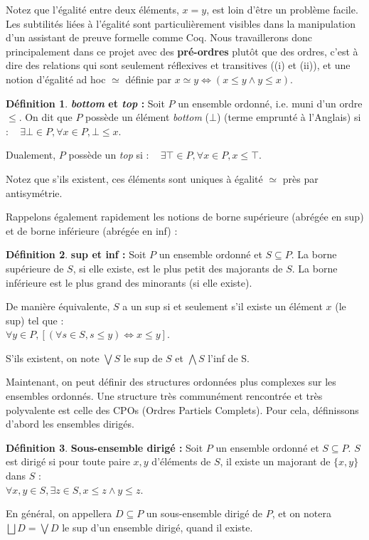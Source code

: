 \documentclass{article}
\theoremstyle{definition}
\newtheorem{definition}{Définition}[section]
\begin{document}
Notez que l'égalité entre deux éléments, $x = y$, est loin d'être un problème facile. Les subtilités liées à l'égalité sont particulièrement visibles dans la manipulation d'un assistant de preuve formelle comme Coq. Nous travaillerons donc principalement dans ce projet avec des \textbf{pré-ordres} plutôt que des ordres, c'est à dire des relations qui sont seulement réflexives et transitives ((i) et (ii)), et une notion d'égalité ad hoc $\simeq$ définie par $x \simeq y \Longleftrightarrow (x \leq y \wedge y \leq x)$.

\begin{definition}{\textbf{\textit{bottom} et \textit{top} : }}
Soit $P$ un ensemble ordonné, i.e. muni d'un ordre $\leq$. On dit que $P$ possède un élément \textit{bottom} ($\bot$) (terme emprunté à l'Anglais) si : ~ $\exists \bot \in P, \forall x \in P, \bot \leq x$.

\noindent Dualement, $P$ possède un \textit{top} si : ~ $\exists \top \in P, \forall x \in P, x \leq \top$.

Notez que s'ils existent, ces éléments sont uniques à égalité $\simeq$ près par antisymétrie.
\end{definition}

Rappelons également rapidement les notions de borne supérieure (abrégée en sup) et de borne inférieure (abrégée en inf) :

\begin{definition}{\textbf{sup et inf : }}
Soit $P$ un ensemble ordonné et $S \subseteq P$. La borne supérieure de $S$, si elle existe, est le plus petit des majorants de $S$. La borne inférieure est le plus grand des minorants (si elle existe).

De manière équivalente, $S$ a un sup si et seulement s'il existe un élément $x$ (le sup) tel que :\\ $\forall y \in P,
[(\forall s \in S, s \leq y) \Longleftrightarrow x \leq y]$.

S'ils existent, on note $\bigvee S$ le sup de $S$ et $\bigwedge S$ l'inf de S.
\end{definition}

Maintenant, on peut définir des structures ordonnées plus complexes sur les ensembles ordonnés. Une structure très communément rencontrée et très polyvalente est celle des CPOs (Ordres Partiels Complets). Pour cela, définissons d'abord les ensembles dirigés.

\begin{definition}{\textbf{Sous-ensemble dirigé : }}
\label{diriges}
Soit $P$ un ensemble ordonné et $S \subseteq P$. $S$ est dirigé si pour toute paire $x,y$ d'éléments de $S$, il existe un majorant de $\{x, y\}$ dans $S$ :\\ $\forall x, y \in S, \exists z \in S, x \leq z \wedge y \leq z$.

En général, on appellera $D \subseteq P$ un sous-ensemble dirigé de $P$, et on notera $\bigsqcup D = \bigvee D$ le sup d'un ensemble dirigé, quand il existe.
\end{definition}
\end{document}
